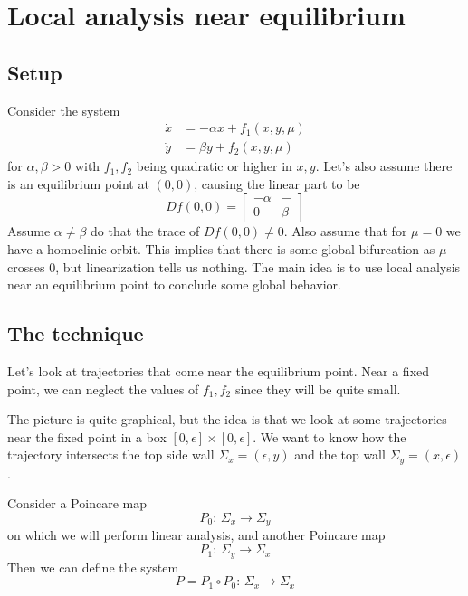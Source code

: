 \documentclass{article}
\begin{document}
\section{Local analysis near equilibrium}

\subsection{Setup}

Consider the system 
\begin{align*}
    \dot{x} &= -\alpha x + f_1(x,y,\mu)\\
    \dot{y} &= \beta y + f_2(x,y,\mu)
\end{align*}
for $\alpha, \beta >0$ with $f_1,f_2$ being quadratic or higher in $x,y$. Let's also assume there is an equilibrium point at $(0,0)$, causing the linear part to be 
\[
Df(0,0) = \begin{bmatrix}
    -\alpha & - \\ 0 & \beta
\end{bmatrix}
\]
Assume $\alpha\neq \beta$ do that the trace of $Df(0,0)\neq 0$. Also assume that for $\mu=0$ we have a homoclinic orbit. This implies that there is some global bifurcation as $\mu$ crosses $0$, but linearization tells us nothing. The main idea is to use local analysis near an equilibrium point to conclude some global behavior.

\subsection{The technique}

Let's look at trajectories that come near the equilibrium point. Near a fixed point, we can neglect the values of $f_1,f_2$ since they will be quite small. 

The picture is quite graphical, but the idea is that we look at some trajectories near the fixed point in a box $[0,\epsilon]\times [0,\epsilon]$. We want to know how the trajectory intersects the top side wall $\Sigma_x = (\epsilon,y)$ and the top wall $\Sigma_y = (x,\epsilon)$.

Consider a Poincare map
\[
P_0:\, \Sigma_x \to \Sigma_y
\]
on which we will perform linear analysis, and another Poincare map 
\[
P_1:\, \Sigma_y \to \Sigma_x
\]
Then we can define the system 
\[
P = P_1\circ P_0:\, \Sigma_x \to\Sigma_x
\]
\end{document}
